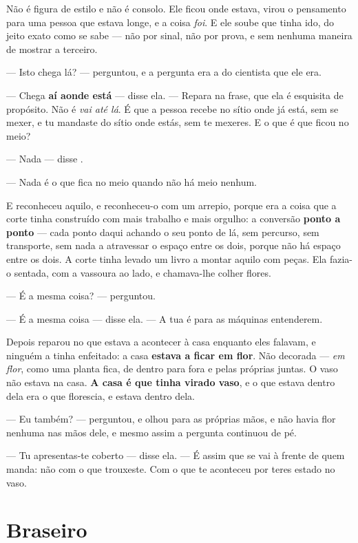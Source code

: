 \documentclass[livro.tex]{subfiles}
\begin{document}
\medskip
\noindent Não é figura de estilo e não é consolo. Ele ficou onde estava, virou
o pensamento para uma pessoa que estava longe, e a coisa \emph{foi}. E ele soube
que tinha ido, do jeito exato como se sabe --- não por sinal, não por prova, e
sem nenhuma maneira de mostrar a terceiro.

\medskip
\noindent --- Isto chega lá? --- perguntou, e a pergunta era a do cientista que
ele era.

--- Chega \textbf{aí aonde está} --- disse ela. --- Repara na frase, que ela é
esquisita de propósito. Não é \emph{vai até lá}. É que a pessoa recebe no sítio
onde já está, sem se mexer, e tu mandaste do sítio onde estás, sem te mexeres. E
o que é que ficou no meio?

--- Nada --- disse \Ben .

--- Nada é o que fica no meio quando não há meio nenhum.

\medskip
\noindent E \Ben reconheceu aquilo, e reconheceu-o com um arrepio, porque
era a coisa que a corte tinha construído com mais trabalho e mais orgulho: a
conversão \textbf{ponto a ponto} --- cada ponto daqui achando o seu ponto de
lá, sem percurso, sem transporte, sem nada a atravessar o espaço entre os dois,
porque não há espaço entre os dois. A corte tinha levado um livro a montar
aquilo com peças. Ela fazia-o sentada, com a vassoura ao lado, e chamava-lhe
colher flores.

\medskip
\noindent --- É a mesma coisa? --- perguntou.

--- É a mesma coisa --- disse ela. --- A tua é para as máquinas entenderem.

\medskip
\noindent Depois \Ben reparou no que estava a acontecer à casa enquanto eles
falavam, e ninguém a tinha enfeitado: a casa \textbf{estava a ficar em flor}.
Não decorada --- \emph{em flor}, como uma planta fica, de dentro para fora e
pelas próprias juntas. O vaso não estava na casa. \textbf{A casa é que tinha
virado vaso}, e o que estava dentro dela era o que florescia, e \Ben estava
dentro dela.

\medskip
\noindent --- Eu também? --- perguntou, e olhou para as próprias mãos, e não
havia flor nenhuma nas mãos dele, e mesmo assim a pergunta continuou de pé.

--- Tu apresentas-te coberto --- disse ela. --- É assim que se vai à frente de
quem manda: não com o que trouxeste. Com o que te aconteceu por teres estado no
vaso.

\chapter{Braseiro}
\end{document}
